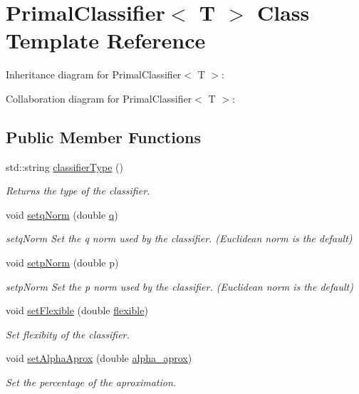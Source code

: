 \hypertarget{class_primal_classifier}{}\section{Primal\+Classifier$<$ T $>$ Class Template Reference}
\label{class_primal_classifier}


Inheritance diagram for Primal\+Classifier$<$ T $>$\+:


Collaboration diagram for Primal\+Classifier$<$ T $>$\+:
\subsection*{Public Member Functions}
\begin{DoxyCompactItemize}
\item 
std\+::string \mbox{\hyperlink{class_primal_classifier_a637fc3cb89994277e902758c7fc3f763}{classifier\+Type}} ()
\begin{DoxyCompactList}\small\item\em Returns the type of the classifier. \end{DoxyCompactList}\item 
void \mbox{\hyperlink{class_primal_classifier_a7e6953c01b190e6ef968b75bd578ad7d}{setq\+Norm}} (double \mbox{\hyperlink{class_primal_classifier_ae30c00c25bce4b1623baa54b5e2812b4}{q}})
\begin{DoxyCompactList}\small\item\em setq\+Norm Set the q norm used by the classifier. (Euclidean norm is the default) \end{DoxyCompactList}\item 
void \mbox{\hyperlink{class_primal_classifier_ad0c3b7577b6c11da7394105dd2002f1d}{setp\+Norm}} (double p)
\begin{DoxyCompactList}\small\item\em setp\+Norm Set the p norm used by the classifier. (Euclidean norm is the default) \end{DoxyCompactList}\item 
void \mbox{\hyperlink{class_primal_classifier_a7e5c459cb4a377c794502cd9831ee095}{set\+Flexible}} (double \mbox{\hyperlink{class_primal_classifier_a5d41554dc1158ede39d387fecf73c96e}{flexible}})
\begin{DoxyCompactList}\small\item\em Set flexibity of the classifier. \end{DoxyCompactList}\item 
void \mbox{\hyperlink{class_primal_classifier_a049f4814d38b456c80c40cee5595502b}{set\+Alpha\+Aprox}} (double \mbox{\hyperlink{class_primal_classifier_a2668546ac4a39e10f72cbd2e865c41a7}{alpha\+\_\+aprox}})
\begin{DoxyCompactList}\small\item\em Set the percentage of the aproximation. \end{DoxyCompactList}\end{DoxyCompactItemize}
